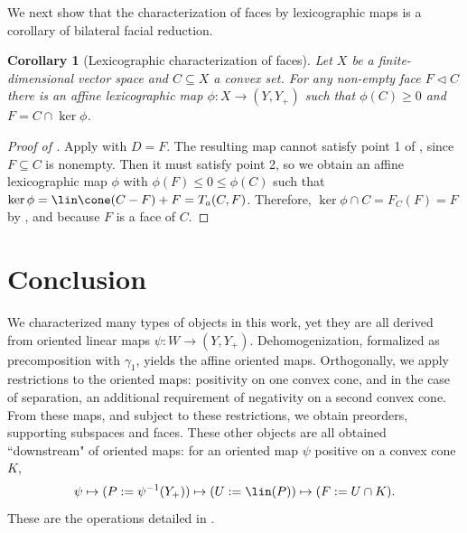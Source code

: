 \documentclass{article}
\theoremstyle{plain}
\newtheorem{corollary}[corollary]{Corollary}
\theoremstyle{definition}
\theoremstyle{remark}
\begin{document}
We next show that the characterization of faces by lexicographic maps is a corollary of
bilateral facial reduction.
\begin{corollary}[Lexicographic characterization of faces]
\label{loc:lexicographic_characterization_of_faces.statement}
Let $X$ be a finite-dimensional vector space and $C \subseteq X$ a convex set. For any non-empty face $F \triangleleft C$ there is an affine lexicographic map $\phi:X \to (Y, Y_+)$ such that $\phi(C) \geq 0$ and $F = C \cap \ker\phi$.
\end{corollary}
\begin{proof}[\hypertarget{loc:lexicographic_characterization_of_faces.proof}{}Proof of ]

Apply  with $D = F$. The resulting map cannot satisfy point 1 of , since $F \subseteq C$ is nonempty. Then it must satisfy point 2, so
we obtain an affine lexicographic map $\phi$ with $\phi(F) \le 0 \le \phi(C)$
such that $\ker \phi = \lin\cone(C-F) + F = T_a(C,F)$. Therefore, $\ker \phi \cap C = F_C(F) = F$
by , and because $F$ is a face of $C$.
\end{proof}
\section{Conclusion}
\label{loc:body.conclusion}
We characterized many types of objects in this work, yet they are all derived from oriented linear maps $\psi:W \to (Y, Y_+)$.
Dehomogenization, formalized as precomposition with $\gamma_1$, yields the affine oriented maps. Orthogonally, we apply restrictions to the oriented maps: positivity on one convex cone, and in the case of separation, an additional requirement of negativity on a second convex cone. From these maps, and subject to these restrictions, we obtain preorders, supporting subspaces and faces.
These other objects are all obtained ``downstream" of oriented maps: for an
oriented map $\psi$ positive on a convex cone $K$,
\begin{equation*}
\psi \mapsto (P := \psi^{-1}(Y_+)) \mapsto (U := \lin(P)) \mapsto (F := U \cap K).
\end{equation*}
These are the operations detailed in .
\end{document}

